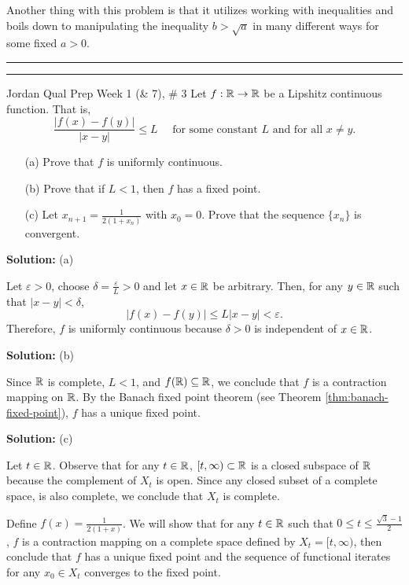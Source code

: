 \documentclass{article}
\begin{document}
Another thing with this problem is that it utilizes working with inequalities and boils down to manipulating the inequality $b > \sqrt{a}$ in many different ways for some fixed $a>0$.\\ 

\hrule \vspace{2pt}
\hrule 

\break 

\begin{problem}{Jordan Qual Prep Week 1 (\& 7), \# 3} Let $f:\mathbb R \to \mathbb R$ be a Lipshitz continuous function. That is, 
	\[\frac{ |f(x)- f(y)| }{|x-y|} \leq L \quad \text{ for some constant $L$ and for all $x\neq y$.}\]
	\begin{enumerate}
		\item[(a)] Prove that $f$ is uniformly continuous.
		\item[(b)] Prove that if $L<1$, then $f$ has a fixed point. 
		\item[(c)] Let $x_{n+1} = \frac{ 1 }{2( 1+ x_n)}$ with $x_0= 0$. Prove that the sequence $\{x_n\}$ is convergent.
	\end{enumerate}
\end{problem}

\textbf{Solution:} (a)

Let $\varepsilon > 0$, choose $\delta = \frac{\varepsilon}{L}>0$ and let $x\in\mathbb R$ be arbitrary. Then, for any $y\in \mathbb R$ such that $|x-y|<\delta$,
	\[ |f(x) - f(y)| \leq L|x-y| < \varepsilon.\]
Therefore, $f$ is uniformly continuous because $\delta>0$ is independent of $x\in\mathbb R$. 

\textbf{Solution:} (b)

Since $\mathbb R$ is complete, $L<1$, and $f(\mathbb R)\subseteq \mathbb R$, we conclude that $f$ is a contraction mapping on $\mathbb R$. By the Banach fixed point theorem (see Theorem \ref{thm:banach-fixed-point}), $f$ has a unique fixed point.

\textbf{Solution:} (c)

Let $t\in\mathbb R$. Observe that for any $t\in \mathbb R$, $[t,\infty)\subset \mathbb R$ is a closed subspace of $\mathbb R$ because the complement of $X_t$ is open. Since any closed subset of a complete space, is also complete, we conclude that $X_t$ is complete. 

Define $f(x) = \frac{1}{2(1+x)}$. We will show that for any $t\in \mathbb R$ such that $0 \leq t \leq \frac{\sqrt{3} - 1}{2}$, $f$ is a contraction mapping on a complete space defined by $X_t = [t, \infty)$, then conclude that $f$ has a unique fixed point and the sequence of functional iterates for any $x_0\in X_t$ converges to the fixed point. 
\end{document}
